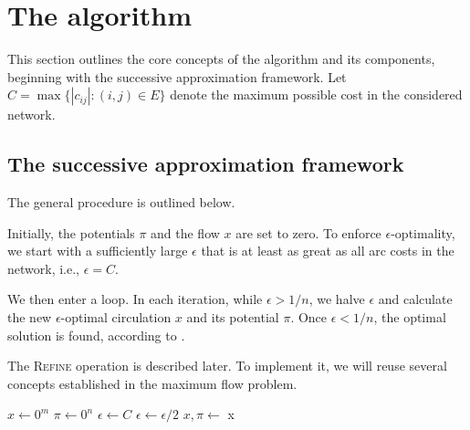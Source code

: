 \section{The algorithm}

This section outlines the core concepts of the algorithm and its components, beginning with the successive approximation framework. Let $C = \max \{|c_{ij}|\colon (i,j) \in E\}$ denote the maximum possible cost in the considered network.

\subsection{The successive approximation framework}

The general procedure is outlined below.

Initially, the potentials $\pi$ and the flow $x$ are set to zero. To enforce $\epsilon$-optimality, we start with a sufficiently large $\epsilon$ that is at least as great as all arc costs in the network, i.e., $\epsilon = C$.

We then enter a loop. In each iteration, while $\epsilon > 1/n$, we halve $\epsilon$ and calculate the new $\epsilon$-optimal circulation $x$ and its potential $\pi$. Once $\epsilon < 1/n$, the optimal solution is found, according to .

The \textsc{Refine} operation is described later. To implement it, we will reuse several concepts established in the maximum flow problem.

\begin{algorithm}[H]
\caption{\textsc{SuccessiveApproximationAlgorithm}$(G,c, u)$}
\label{alg:succ_approx_framework}
    \begin{algorithmic}[1]
        \State $x \gets 0^m$ 
        \State $\pi \gets 0^n$
        \State $\epsilon \gets C$
        \State $\epsilon \gets \epsilon/2$
        \State $x, \pi \gets$ 
        \EndWhile
        \State\Return x
    \end{algorithmic}
\end{algorithm}


